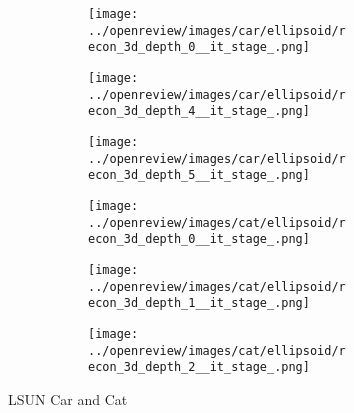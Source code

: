 \begin{figure}[h]
\begin{subfigure}{0.80\textwidth}
        \begin{subfigure}{0.16\textwidth}
            \centering
            \texttt{[image: ../openreview/images/car/ellipsoid/recon\_3d\_depth\_0\_\_it\_stage\_.png]}
            \caption{}
        \end{subfigure}
        \begin{subfigure}{0.16\textwidth}
            \centering
            \texttt{[image: ../openreview/images/car/ellipsoid/recon\_3d\_depth\_4\_\_it\_stage\_.png]}
            \caption{}
        \end{subfigure}
        \begin{subfigure}{0.16\textwidth}
            \centering
            \texttt{[image: ../openreview/images/car/ellipsoid/recon\_3d\_depth\_5\_\_it\_stage\_.png]}
            \caption{}
        \end{subfigure}
        \begin{subfigure}{0.16\textwidth}
            \centering
            \texttt{[image: ../openreview/images/cat/ellipsoid/recon\_3d\_depth\_0\_\_it\_stage\_.png]}
            \caption{}
        \end{subfigure}
        \begin{subfigure}{0.16\textwidth}
            \centering
            \texttt{[image: ../openreview/images/cat/ellipsoid/recon\_3d\_depth\_1\_\_it\_stage\_.png]}
            \caption{}
        \end{subfigure}
        \begin{subfigure}{0.16\textwidth}
            \centering
            \texttt{[image: ../openreview/images/cat/ellipsoid/recon\_3d\_depth\_2\_\_it\_stage\_.png]}
            \caption{}
        \end{subfigure}
    
    \end{subfigure}
    \caption{LSUN Car and Cat}
    \label{fig:result-car-cat}
\end{figure}
